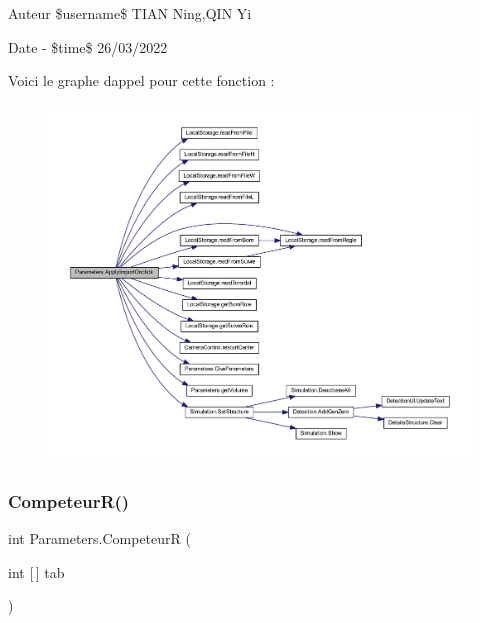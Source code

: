 \begin{DoxyAuthor}{Auteur}
\$username\$ T\+I\+AN Ning,Q\+IN Yi 
\end{DoxyAuthor}
\begin{DoxyDate}{Date}
-\/ \$time\$ 26/03/2022 
\end{DoxyDate}
Voici le graphe d\textquotesingle{}appel pour cette fonction \+:
\nopagebreak
\begin{figure}[H]
\begin{center}
\leavevmode
\includegraphics[width=350pt]{class_parameters_a8438e2686a572fc6d1cc2947489da01d_cgraph}
\end{center}
\end{figure}
\mbox{\label{class_parameters_a9eb50f6a67cb480f303e5d6f91997f7d}} 
\subsubsection{\texorpdfstring{Competeur\+R()}{CompeteurR()}}
{\footnotesize\ttfamily int Parameters.\+CompeteurR (\begin{DoxyParamCaption}\item[{int \mbox{[}$\,$\mbox{]}}]{tab }\end{DoxyParamCaption})\hspace{0.3cm}{\ttfamily [inline]}}

